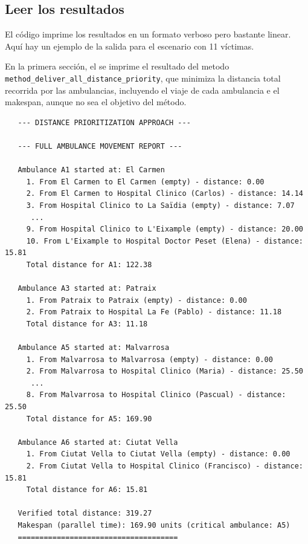 \subsection{Leer los resultados}

El código imprime los resultados en un formato verboso pero bastante linear.
Aquí hay un ejemplo de la salida para el escenario con 11 víctimas.


En la primera sección, el se imprime el resultado del metodo 
\lstinline|method_deliver_all_distance_priority|, que minimiza la distancia total recorrida por las ambulancias, incluyendo el viaje de cada ambulancia e el makespan, aunque no sea el objetivo del método.
\lstset{inputencoding=utf8/latin1}
\begin{verbatim}
   --- DISTANCE PRIORITIZATION APPROACH ---
   
   --- FULL AMBULANCE MOVEMENT REPORT ---
   
   Ambulance A1 started at: El Carmen
     1. From El Carmen to El Carmen (empty) - distance: 0.00
     2. From El Carmen to Hospital Clinico (Carlos) - distance: 14.14
     3. From Hospital Clinico to La Saïdia (empty) - distance: 7.07
      ...
     9. From Hospital Clinico to L'Eixample (empty) - distance: 20.00
     10. From L'Eixample to Hospital Doctor Peset (Elena) - distance: 15.81
     Total distance for A1: 122.38
   
   Ambulance A3 started at: Patraix
     1. From Patraix to Patraix (empty) - distance: 0.00
     2. From Patraix to Hospital La Fe (Pablo) - distance: 11.18
     Total distance for A3: 11.18
   
   Ambulance A5 started at: Malvarrosa
     1. From Malvarrosa to Malvarrosa (empty) - distance: 0.00
     2. From Malvarrosa to Hospital Clinico (Maria) - distance: 25.50
      ...
     8. From Malvarrosa to Hospital Clinico (Pascual) - distance: 25.50
     Total distance for A5: 169.90
   
   Ambulance A6 started at: Ciutat Vella
     1. From Ciutat Vella to Ciutat Vella (empty) - distance: 0.00
     2. From Ciutat Vella to Hospital Clinico (Francisco) - distance: 15.81
     Total distance for A6: 15.81
   
   Verified total distance: 319.27
   Makespan (parallel time): 169.90 units (critical ambulance: A5)
   =====================================
\end{verbatim}

